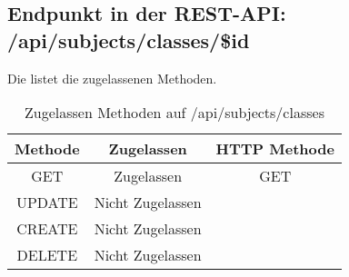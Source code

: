 \subsection{Endpunkt in der REST-API: /api/subjects/classes/\$id}
Die  listet die zugelassenen Methoden. 

\begin{table}[!htbp]
	\begin{tabular}{|c|c|c|}
		\hline
			\textbf{Methode} & \textbf{Zugelassen} & \textbf{HTTP Methode} \\ \hline
			GET & Zugelassen & GET \\ \hline
			UPDATE & Nicht Zugelassen & \\ \hline 
			CREATE & Nicht Zugelassen & \\ \hline 
			DELETE & Nicht Zugelassen & \\ \hline
	\end{tabular}

		\caption{Zugelassen Methoden auf /api/subjects/classes}
		\label{tab:end:rest:api:subjects:classes:meth}
\end{table}
